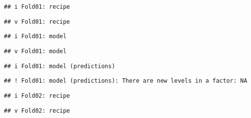 \documentclass[
]{article}
\newenvironment{Shaded}{\begin{snugshade}}{\end{snugshade}}
\newcommand{\DataTypeTok}[1]{\textcolor[rgb]{0.13,0.29,0.53}{#1}}
\newcommand{\FloatTok}[1]{\textcolor[rgb]{0.00,0.00,0.81}{#1}}
\newcommand{\KeywordTok}[1]{\textcolor[rgb]{0.13,0.29,0.53}{\textbf{#1}}}
\newcommand{\NormalTok}[1]{#1}
\newcommand{\OperatorTok}[1]{\textcolor[rgb]{0.81,0.36,0.00}{\textbf{#1}}}
\newcommand{\OtherTok}[1]{\textcolor[rgb]{0.56,0.35,0.01}{#1}}
\newcommand{\StringTok}[1]{\textcolor[rgb]{0.31,0.60,0.02}{#1}}
\begin{document}
\begin{Shaded}
\end{Shaded}

\begin{verbatim}
## i Fold01: recipe
\end{verbatim}

\begin{verbatim}
## v Fold01: recipe
\end{verbatim}

\begin{verbatim}
## i Fold01: model
\end{verbatim}

\begin{verbatim}
## v Fold01: model
\end{verbatim}

\begin{verbatim}
## i Fold01: model (predictions)
\end{verbatim}

\begin{verbatim}
## ! Fold01: model (predictions): There are new levels in a factor: NA
\end{verbatim}

\begin{verbatim}
## i Fold02: recipe
\end{verbatim}

\begin{verbatim}
## v Fold02: recipe
\end{verbatim}
\end{document}
